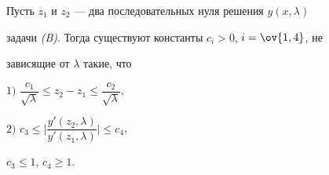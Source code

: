  


\begin{lem} 


Пусть $z_1$ и $z_2$ --- два последовательных нуля решения $y(x,\lambda)$ 


задачи {\em (B)}. Тогда существуют константы $c_i>0$, $i=\ov{1,4}$, не 


зависящие от $\lambda$ такие, что 


 


$1)$ $\dfrac{c_1}{\sqrt{\lambda}}\le z_2-z_1\le 


\dfrac{c_2}{\sqrt{\lambda}}$, 


 


$2)$ $c_3\le\bigg|\dfrac{y'(z_2,\lambda)}{y'(z_1,\lambda)} \bigg|\le c_4$, 


$c_3\le1$, $c_4\ge1$. 


\end{lem} 


 


